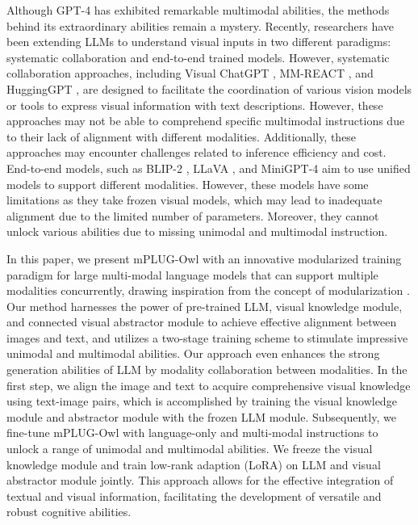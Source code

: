 \documentclass{article}
\newcommand{\modelname}{mPLUG-Owl\xspace}
\begin{document}
Although GPT-4 \citep{gpt4} has exhibited remarkable multimodal abilities, the methods behind its extraordinary abilities remain a mystery. Recently, researchers have been extending LLMs to understand visual inputs in two different paradigms: systematic collaboration and end-to-end trained models. However, systematic collaboration approaches, including Visual ChatGPT \citep{visualchatgpt}, MM-REACT \citep{mmreact}, and HuggingGPT \citep{hugginggpt}, are designed to facilitate the coordination of various vision models or tools to express visual information with text descriptions. However, these approaches may not be able to comprehend specific multimodal instructions due to their lack of alignment with different modalities. Additionally, these approaches may encounter challenges related to inference efficiency and cost. End-to-end models, such as BLIP-2 \citep{blip2}, LLaVA \citep{llava}, and MiniGPT-4 \citep{minigpt4} aim to use unified models to support different modalities. However, these models have some limitations as they take frozen visual models, which may lead to inadequate alignment due to the limited number of parameters. Moreover, they cannot unlock various abilities due to missing unimodal and multimodal instruction.

In this paper, we present \modelname with an innovative modularized training paradigm for large multi-modal language models that can support multiple modalities concurrently, drawing inspiration from the concept of modularization \citep{mplug2, mplug, e2evlp, hitea}. Our method harnesses the power of pre-trained LLM, visual knowledge module, and connected visual abstractor module to achieve effective alignment between images and text, and utilizes a two-stage training scheme to stimulate impressive unimodal and multimodal abilities. Our approach even enhances the strong generation abilities of LLM by modality collaboration between modalities. In the first step, we align the image and text to acquire comprehensive visual knowledge using text-image pairs, which is accomplished by training the  visual knowledge module and abstractor module with the frozen LLM module. Subsequently, we fine-tune mPLUG-Owl with language-only and multi-modal instructions to unlock a range of unimodal and multimodal abilities. We freeze the visual knowledge module and train low-rank adaption (LoRA) \citep{lora} on LLM and visual abstractor module jointly. This approach allows for the effective integration of textual and visual information, facilitating the development of versatile and robust cognitive abilities.
\end{document}
